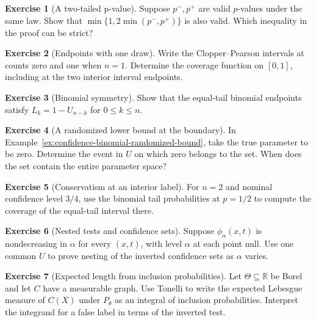 \documentclass[11pt,oneside]{book}
\theoremstyle{definition}
\newtheorem{exercise}{Exercise}[section]
\theoremstyle{remark}
\newcommand{\R}{\mathbb R}
\begin{document}
\begin{exercise}[A two-tailed p-value]
\label{exer:confidence-two-tail-union-bound}
Suppose $p^-,p^+$ are valid $p$-values under the same law.
Show that $\min\{1,2\min(p^-,p^+)\}$ is also valid.
Which inequality in the proof can be strict?
\end{exercise}

\begin{exercise}[Endpoints with one draw]
\label{exer:confidence-cp-one-draw}
Write the Clopper--Pearson intervals at counts zero and one
when $n=1$. Determine the coverage function on $[0,1]$,
including at the two interior interval endpoints.
\end{exercise}

\begin{exercise}[Binomial symmetry]
\label{exer:confidence-cp-symmetry}
Show that the equal-tail binomial endpoints satisfy
$L_k=1-U_{n-k}$ for $0\leq k\leq n$.
\end{exercise}

\begin{exercise}[A randomized lower bound at the boundary]
\label{exer:confidence-randomized-bound-zero}
In Example~\ref{ex:confidence-binomial-randomized-bound}, take
the true parameter to be zero. Determine the event in $U$
on which zero belongs to the set. When does the set contain
the entire parameter space?
\end{exercise}

\begin{exercise}[Conservatism at an interior label]
\label{exer:confidence-binomial-interior-conservatism}
For $n=2$ and nominal confidence level $3/4$, use the
binomial tail probabilities at $p=1/2$ to compute the
coverage of the equal-tail interval there.
\end{exercise}

\begin{exercise}[Nested tests and confidence sets]
\label{exer:confidence-inversion-nesting}
Suppose $\phi_\alpha(x,t)$ is nondecreasing in $\alpha$ for
every $(x,t)$, with level $\alpha$ at each point null.
Use one common $U$ to prove nesting of the inverted
confidence sets as $\alpha$ varies.
\end{exercise}

\begin{exercise}[Expected length from inclusion probabilities]
\label{exer:confidence-expected-length-tonelli}
Let $\Theta\subseteq\R$ be Borel and let $C$ have a
measurable graph. Use Tonelli to write the expected Lebesgue
measure of $C(X)$ under $P_\theta$ as an integral of
inclusion probabilities. Interpret the integrand for a false
label in terms of the inverted test.
\end{exercise}
\end{document}
